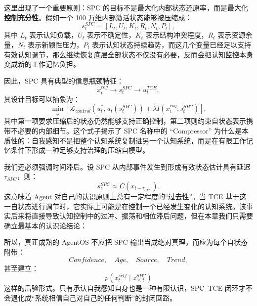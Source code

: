 这里出现了一个重要原则：SPC 的目标不是最大化内部状态还原率，而是最大化\textbf{控制充分性}。假如一个 100 万维内部激活状态能够被压缩成：
\begin{equation}
s_t^{SPC}
=
[
L_t,
U_t,
K_t,
R_t,
N_t,
P_t
],
\end{equation}
其中 $L_t$ 表示认知负载，$U_t$ 表示不确定性，$K_t$ 表示结构冲突程度，$R_t$ 表示资源余量，$N_t$ 表示新颖性压力，$P_t$ 表示认知状态持续趋势，而这几个变量已经足以支持有效认知调节，那么继续恢复底层全部状态不仅没有必要，反而会把认知监控本身变成新的工作记忆负担。

因此，SPC 具有典型的信息瓶颈特征：
\begin{equation}
x_t^{cog}
\rightarrow
s_t^{SPC}
\rightarrow
u_t^{TCE},
\end{equation}
其设计目标可以抽象为：
\begin{equation}
\min_{\phi}
\left[
\mathcal{L}_{control}
\left(
u_t^{*},
u_t(s_t^{SPC})
\right)
+
\lambda
I
\left(
x_t^{cog};
s_t^{SPC}
\right)
\right],
\label{eq:spc-information-bottleneck}
\end{equation}
其中第一项要求压缩后的状态仍然能够支持正确控制，第二项则约束自状态表示携带不必要的内部细节。这个式子揭示了 SPC 名称中的 ``Compressor'' 为什么是本质性的：自我感知不是把整个认知系统复制进另一个认知系统，而是在有限工作记忆条件下形成一种足够支持治理的压缩自模型。

我们还必须强调时间滞后。设 SPC 从内部事件发生到形成有效状态估计具有延迟 $\tau_{SPC}$，则：
\begin{equation}
s_t^{SPC}
\approx
C
\left(
x_{t-\tau_{SPC}}
\right).
\end{equation}
这意味着 Agent 对自己的认识原则上总有一定程度的``过去性''。当 TCE 基于这一自状态进行调节时，它实际上可能是在控制一个已经发生变化的认知系统。该事实后来将直接导致认知控制中的过冲、振荡和相位滞后问题，但在本章我们只需要确立最基本的认识论结论：

\begin{statementbox}
\centering
{}
\end{statementbox}

所以，真正成熟的 AgentOS 不应把 SPC 输出当成绝对真理，而应为每个自状态附带：
\begin{equation}
Confidence,\quad
Age,\quad
Source,\quad
Trend,
\end{equation}
甚至建立：
\begin{equation}
p
\left(
x_t^{self}
\mid
z_{\leq t}^{SPC}
\right)
\end{equation}
这样的后验形式。只有承认自我感知自身也是一种有限认识，SPC--TCE 闭环才不会退化成``系统相信自己对自己的任何判断''的封闭回路。

